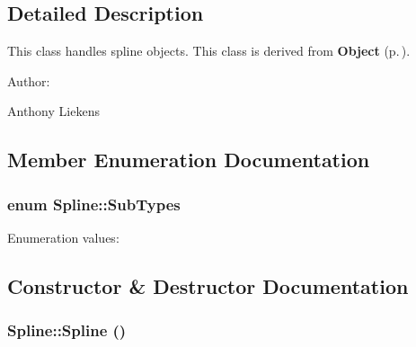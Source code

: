 \subsection{Detailed Description}
This class handles spline objects. This class is derived from {\bf Object} {\rm (p.\,\pageref{classObject})}. \begin{Desc}
\item[Author: ]\par
Anthony Liekens \end{Desc}




\subsection{Member Enumeration Documentation}
\subsubsection{\setlength{\rightskip}{0pt plus 5cm}enum Spline::Sub\-Types}\label{classSpline_s2}


\begin{Desc}
\item[Enumeration values: ]\par
\begin{description}
\item[{\em 
{\em Opened}\label{classSpline_s2s0}
}]\item[{\em 
{\em Closed}\label{classSpline_s2s1}
}]\end{description}
\end{Desc}



\subsection{Constructor \& Destructor Documentation}
\subsubsection{\setlength{\rightskip}{0pt plus 5cm}Spline::Spline ()}\label{classSpline_a0}


